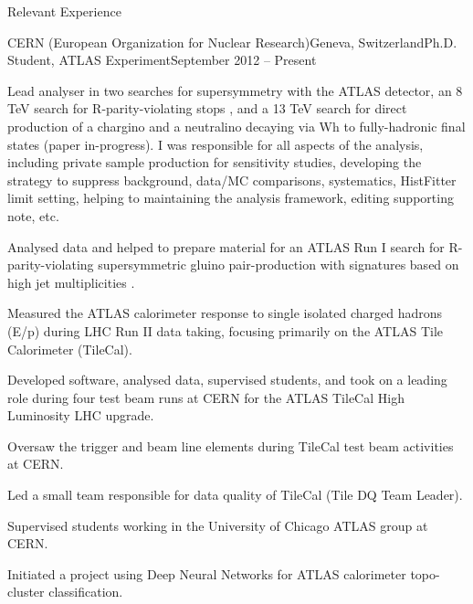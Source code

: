 \documentclass{resume}
\begin{document}

\begin{rsection}{Relevant Experience}

  \begin{rsubsection}{CERN (European Organization for Nuclear Research)}{Geneva, Switzerland}{Ph.D. Student, ATLAS Experiment}{September 2012 -- Present}
  \item Lead analyser in two searches for supersymmetry with the ATLAS detector, an 8 TeV search for R-parity-violating stops \cite{RPVstop2016}, and a 13 TeV search for direct production of a chargino and a neutralino decaying via Wh to fully-hadronic final states (paper in-progress). I was responsible for all aspects of the analysis, including private sample production for sensitivity studies, developing the strategy to suppress background, data/MC comparisons, systematics, HistFitter limit setting, helping to maintaining the analysis framework, editing supporting note, etc.
  \item Analysed data and helped to prepare material for an ATLAS Run I search for R-parity-violating supersymmetric gluino pair-production with signatures based on high jet multiplicities \cite{Multijet2015}. 
  \item Measured the ATLAS calorimeter response to single isolated charged hadrons (E/p) during LHC Run II data taking, focusing primarily on the ATLAS Tile Calorimeter (TileCal).
  \item Developed software, analysed data, supervised students, and took on a leading role during four test beam runs at CERN for the ATLAS TileCal High Luminosity LHC upgrade.
  \item Oversaw the trigger and beam line elements during TileCal test beam activities at CERN. 
  \item Led a small team responsible for data quality of TileCal (Tile DQ Team Leader).
  \item Supervised students working in the University of Chicago ATLAS group at CERN.
  \item Initiated a project using Deep Neural Networks for ATLAS calorimeter topo-cluster classification.
  \end{rsubsection}



\end{rsection}
\end{document}
